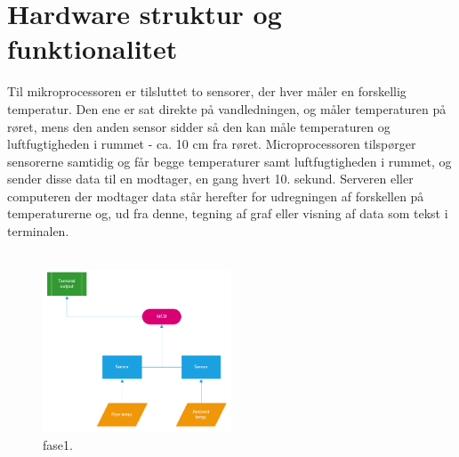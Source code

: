 \section{Hardware struktur og funktionalitet}
Til mikroprocessoren er tilsluttet to sensorer, der hver måler en forskellig temperatur. Den ene er sat direkte på vandledningen, og måler temperaturen på røret, mens den anden sensor sidder så den kan måle temperaturen og luftfugtigheden i rummet - ca. 10 cm fra røret.\newline
Microprocessoren tilspørger sensorerne samtidig og får begge temperaturer samt luftfugtigheden i rummet, og sender disse data til en modtager, en gang hvert 10. sekund.\newline
Serveren eller computeren der modtager data står herefter for udregningen af forskellen på temperaturerne og, ud fra denne, tegning af graf eller visning af data som tekst i terminalen.
\\\\


\begin{figure}[h!]
  \caption{fase1.}
  \centering
  \includegraphics[width=0.5\textwidth]{figures/Phase1.PNG}
\end{figure}






